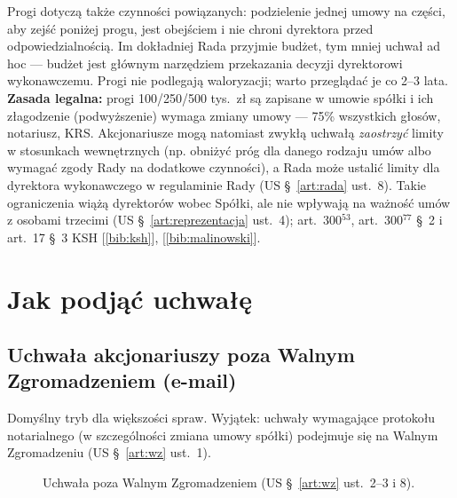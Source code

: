 \documentclass[11pt,a4paper]{report}
\newcommand{\Zr}[1]{[\ref{bib:#1}]}
\begin{document}
\begin{Komentarz}
Progi dotyczą także czynności powiązanych: podzielenie jednej umowy na części, aby zejść poniżej progu, jest obejściem i nie chroni dyrektora przed odpowiedzialnością. Im dokładniej Rada przyjmie budżet, tym mniej uchwał ad hoc --- budżet jest głównym narzędziem przekazania decyzji dyrektorowi wykonawczemu. Progi nie podlegają waloryzacji; warto przeglądać je co 2--3 lata. \textbf{Zasada legalna:} progi 100/250/500 tys.\ zł są zapisane w umowie spółki i ich złagodzenie (podwyższenie) wymaga zmiany umowy --- 75\% wszystkich głosów, notariusz, KRS. Akcjonariusze mogą natomiast zwykłą uchwałą \emph{zaostrzyć} limity w stosunkach wewnętrznych (np. obniżyć próg dla danego rodzaju umów albo wymagać zgody Rady na dodatkowe czynności), a Rada może ustalić limity dla dyrektora wykonawczego w regulaminie Rady (US §~\ref{art:rada} ust.~8). Takie ograniczenia wiążą dyrektorów wobec Spółki, ale nie wpływają na ważność umów z osobami trzecimi (US §~\ref{art:reprezentacja} ust.~4); art.~300$^{53}$, art.~300$^{77}$ §~2 i art.~17 §~3 KSH \Zr{ksh}, \Zr{malinowski}.
\end{Komentarz}

\section{Jak podjąć uchwałę}

\subsection*{Uchwała akcjonariuszy poza Walnym Zgromadzeniem (e-mail)}

Domyślny tryb dla większości spraw. Wyjątek: uchwały wymagające protokołu notarialnego (w szczególności zmiana umowy spółki) podejmuje się na Walnym Zgromadzeniu (US §~\ref{art:wz} ust.~1).

\begin{figure}[H]
\centering
{}
\caption{Uchwała poza Walnym Zgromadzeniem (US §~\ref{art:wz} ust.~2--3 i 8).}
\end{figure}
\end{document}
